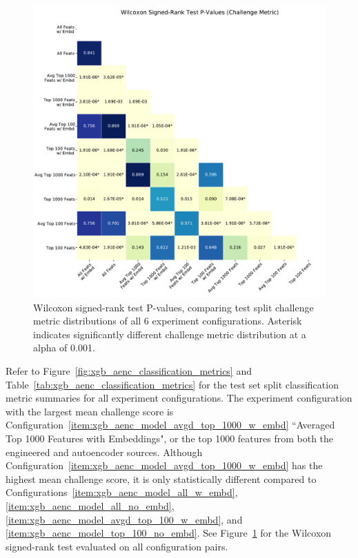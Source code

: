 \documentclass[\main/thesis.tex]{subfiles}
\begin{document}
\begin{figure}[t]
    \centering
    \includegraphics[width=12cm]{figure/xgb_aenc_wilcoxon_srt_p_vals.pdf}
    \caption[Wilcoxon signed-rank test P-values, comparing test split challenge metric distributions of all 6 experiment configurations.]{Wilcoxon signed-rank test P-values, comparing test split challenge metric distributions of all 6 experiment configurations. Asterisk indicates significantly different challenge metric distribution at a alpha of 0.001.}
    \label{fig:xgb_aenc_wilcoxon_srt_p_vals}
\end{figure}

Refer to Figure~\ref{fig:xgb_aenc_classification_metrics} and Table~\ref{tab:xgb_aenc_classification_metrics} for the test set split classification metric summaries for all experiment configurations.
The experiment configuration with the largest mean challenge score is Configuration~\ref{item:xgb_aenc_model_avgd_top_1000_w_embd} ``Averaged Top 1000 Features with Embeddings", or the top 1000 features from both the engineered and autoencoder sources.
Although Configuration~\ref{item:xgb_aenc_model_avgd_top_1000_w_embd} has the highest mean challenge score, it is only statistically different compared to Configurations~\ref{item:xgb_aenc_model_all_w_embd}, \ref{item:xgb_aenc_model_all_no_embd}, \ref{item:xgb_aenc_model_avgd_top_100_w_embd}, and \ref{item:xgb_aenc_model_top_100_no_embd}.
See Figure~\ref{fig:xgb_aenc_wilcoxon_srt_p_vals} for the Wilcoxon signed-rank test evaluated on all configuration pairs.
\end{document}
